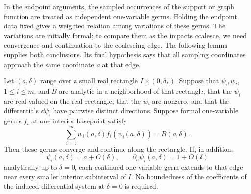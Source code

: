 In the endpoint arguments, the sampled occurrences of the support
or graph function are treated as independent one-variable germs.
Holding the endpoint data fixed gives a weighted relation among
variations of these germs. The variations are initially formal;
to compare them as the impacts coalesce, we need convergence and
continuation to the coalescing edge. The following lemma supplies
both conclusions. Its final hypothesis says that all sampling
coordinates approach the same coordinate \(a\) at that edge.

\begin{lemma}
\label{cont:web-continuation}
Let \((a,\delta)\) range over a small real rectangle
\(I\times(0,\delta_*)\).  Suppose that \(\psi_i,w_i\), \(1\le i\le m\),
and \(B\) are analytic in a neighborhood of that rectangle,
that the \(\psi_i\) are real-valued on the real rectangle,
that the \(w_i\) are nonzero, and that the differentials
\(\dd\psi_i\) have pairwise distinct directions.  Suppose
formal one-variable germs \(f_i\) at one interior basepoint
satisfy
\begin{equation}
 \sum_{i=1}^m w_i(a,\delta)f_i(\psi_i(a,\delta))=B(a,\delta).
 \label{cont:web-equation}
\end{equation}
Then these germs converge and continue along the rectangle.
If, in addition,
\[
 \psi_i(a,\delta)=a+O(\delta),\qquad
 \partial_a\psi_i(a,\delta)=1+O(\delta)
 \]
analytically up to \(\delta=0\), each continued one-variable
germ extends to that edge near every smaller interior
subinterval of \(I\).  No boundedness of the coefficients of
the induced differential system at \(\delta=0\) is required.
\end{lemma}

